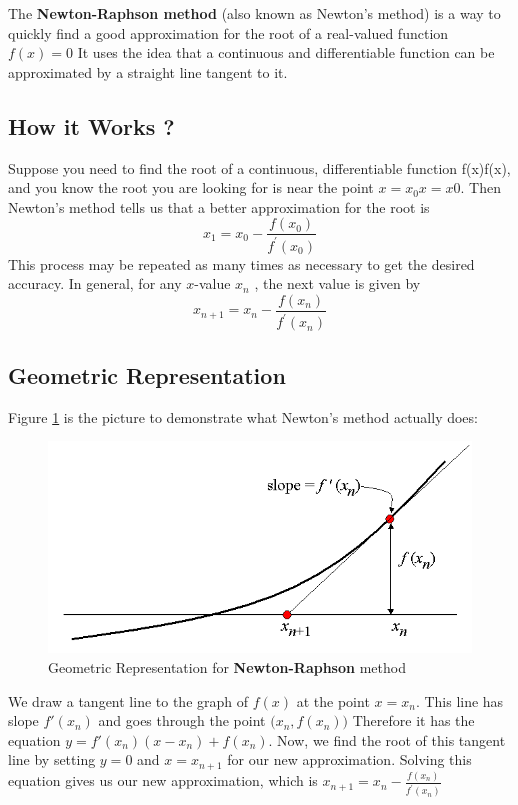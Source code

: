 The \textbf{Newton-Raphson method} (also known as Newton's method) is a way to quickly find a good approximation for the root of a real-valued function $f(x) = 0$ It uses the idea that a continuous and differentiable function can be approximated by a straight line tangent to it.
\subsection{How it Works ?}
Suppose you need to find the root of a continuous, differentiable function f(x)f(x), and you know the root you are looking for is near the point $x = x_0x=x 
0$. Then Newton's method tells us that a better approximation for the root is
\begin{equation}
 x_{1}=x_{0}-\frac{f\left(x_{0}\right)}{f^{\prime}\left(x_{0}\right)} 
\end{equation}
This process may be repeated as many times as necessary to get the desired accuracy. In general, for any $x$-value $x_n$ , the next value is given by
\begin{equation}
 x_{n+1}=x_{n}-\frac{f\left(x_{n}\right)}{f^{\prime}\left(x_{n}\right)} 
\end{equation}
\subsection{Geometric Representation}
Figure \ref{fig:nr1} is the picture to demonstrate what Newton's method actually does:
\begin{figure}[H]
    \centering
    \includegraphics[scale=0.5]{Figures/Chapter2/newtonraphson1.png}
    \caption{Geometric Representation for \textbf{Newton-Raphson} method}
    \label{fig:nr1}
\end{figure}
We draw a tangent line to the graph of $f(x)$ at the point $x = x_n$. This line has slope $f'(x_n) $ and goes through the point $\big(x_n, f(x_n)\big)$
 Therefore it has the equation $y = f'(x_n)(x - x_n) + f(x_n)$. Now, we find the root of this tangent line by setting $y = 0$ and $x=x_{n+1}$ for our new approximation. Solving this equation gives us our new approximation, which is
 $
 x_{n+1}=x_{n}-\frac{f\left(x_{n}\right)}{f^{\prime}\left(x_{n}\right)} 
$
